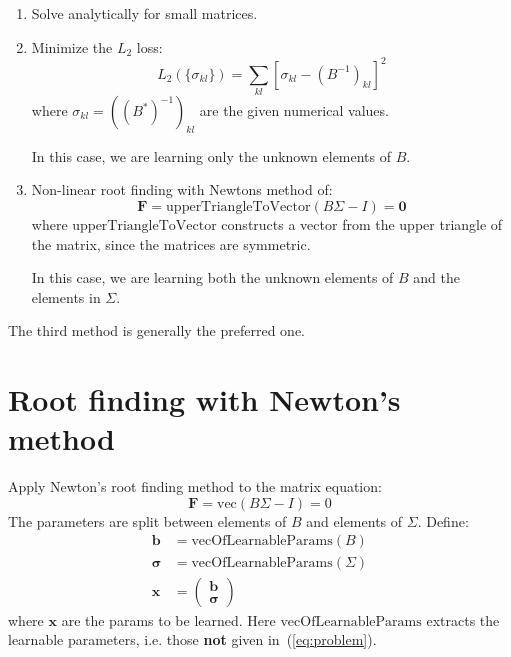 \documentclass[11pt]{article}
\begin{document}
\begin{enumerate}
\item Solve analytically for small matrices.

\item Minimize the $L_2$ loss:
\begin{equation}
L_2( \{ \sigma_{kl} \} ) = \sum_{kl} \left [ \sigma_{kl} - (B^{-1})_{kl} \right ]^2
\end{equation}
where $\sigma_{kl} = ((B^*)^{-1})_{kl}$ are the given numerical values.

In this case, we are learning only the unknown elements of $B$.

\item Non-linear root finding with Newtons method of:
\begin{equation}
\boldsymbol{F} 
= \text{upperTriangleToVector}(B \Sigma - I)
= \boldsymbol{0}
\end{equation}
where $\text{upperTriangleToVector}$ constructs a vector from the upper triangle of the matrix, since the matrices are symmetric.

In this case, we are learning both the unknown elements of $B$ and the elements in $\Sigma$.

\end{enumerate}

The third method is generally the preferred one.


\section{Root finding with Newton's method}


Apply Newton's root finding method to the matrix equation:
\begin{equation}
\boldsymbol{F} = \text{vec}(B\Sigma - I) = 0
\end{equation}
The parameters are split between elements of $B$ and elements of $\Sigma$. Define:
\begin{equation}
\begin{split}
\boldsymbol{b} &= \text{vecOfLearnableParams}(B) \\
\boldsymbol{\sigma} &= \text{vecOfLearnableParams}(\Sigma) \\
\boldsymbol{x} &= \begin{pmatrix}
	\boldsymbol{b} \\
	\boldsymbol{\sigma}
\end{pmatrix}
\end{split}
\end{equation}
where $\boldsymbol{x}$ are the params to be learned. Here $\text{vecOfLearnableParams}$ extracts the learnable parameters, i.e. those \textbf{not} given in~(\ref{eq:problem}).
\end{document}

